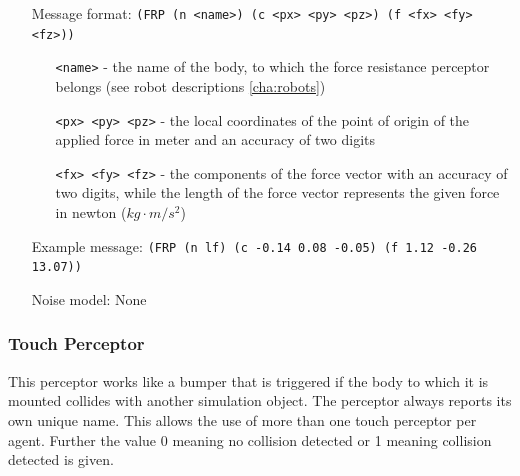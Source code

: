 

\begin{itemize}
	\item[Message format:] \texttt{(FRP (n <name>) (c <px> <py> <pz>) (f <fx> <fy>
	<fz>))}
		\begin{itemize}
		  \item[\texttt{<name>} -] the name of the body, to which the force resistance
		  perceptor belongs (see robot descriptions \ref{cha:robots})
		  \item[\texttt{<px> <py> <pz>} -] the local coordinates of the point of
		  origin of the applied force in meter and an accuracy of two digits
		  \item[\texttt{<fx> <fy> <fz>} -] the components of the force vector
		  with an accuracy of two digits, while the length of the force
		  vector represents the given force in newton ($kg \cdot m/s^{2}$)
		\end{itemize}
	\item[Example message:] \texttt{(FRP (n lf) (c -0.14 0.08 -0.05) (f 1.12 -0.26
	13.07))}
	\item[Noise model:] None
\end{itemize}



\subsubsection{Touch Perceptor}
\label{sec:touchperceptor}
This perceptor works like a bumper that is triggered if the body
to which it is mounted collides with another simulation object. The
perceptor always reports its own unique name. This allows the use of
more than one touch perceptor per agent. Further the value 0 meaning no
collision detected or 1 meaning collision detected is given.

